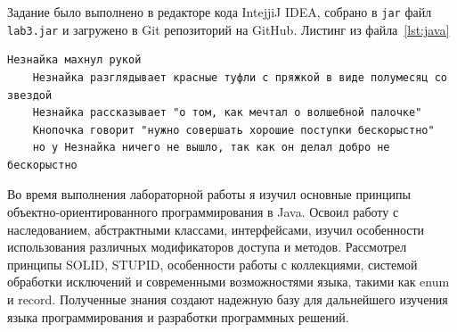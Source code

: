 
    \newpage
    Задание было выполнено в редакторе кода IntejjiJ IDEA, собрано в \verb|jar| файл \verb|lab3.jar| и загружено в Git репозиторий на GitHub.
    Листинг из файла~\ref{lst:java}
    





    \begin{lstlisting}[caption={Результат выполнения программы},label={lst:result}]
    Незнайка махнул рукой
    Незнайка разглядывает красные туфли с пряжкой в виде полумесяц со звездой
    Незнайка рассказывает "о том, как мечтал о волшебной палочке"
    Кнопочка говорит "нужно совершать хорошие поступки бескорыстно"
    но у Незнайка ничего не вышло, так как он делал добро не бескорыстно
    \end{lstlisting}

    Во время выполнения лабораторной работы я изучил основные принципы объектно-ориентированного программирования в Java.
    Освоил работу с наследованием, абстрактными классами, интерфейсами, изучил особенности использования различных модификаторов доступа и методов.
    Рассмотрел принципы SOLID, STUPID, особенности работы с коллекциями, системой обработки исключений и современными возможностями языка, такими как enum и record.
    Полученные знания создают надежную базу для дальнейшего изучения языка программирования и разработки программных решений.
    \newpage





